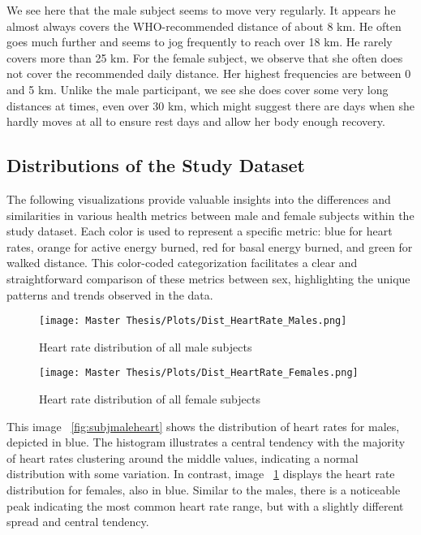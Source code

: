 We see here that the male subject seems to move very regularly. It appears he almost always covers the WHO-recommended distance of about 8 km. He often goes much further and seems to jog frequently to reach over 18 km. He rarely covers more than 25 km. For the female subject, we observe that she often does not cover the recommended daily distance. Her highest frequencies are between 0 and 5 km. Unlike the male participant, we see she does cover some very long distances at times, even over 30 km, which might suggest there are days when she hardly moves at all to ensure rest days and allow her body enough recovery.

\subsection{Distributions of the Study Dataset}

The following visualizations provide valuable insights into the differences and similarities in various health metrics between male and female subjects within the study dataset. Each color is used to represent a specific metric: blue for heart rates, orange for active energy burned, red for basal energy burned, and green for walked distance. This color-coded categorization facilitates a clear and straightforward comparison of these metrics between sex, highlighting the unique patterns and trends observed in the data.

\FloatBarrier
\begin{figure}[h!]
  \centering
  \begin{minipage}[b]{0.7\linewidth}
    \texttt{[image: Master Thesis/Plots/Dist\_HeartRate\_Males.png]}
    \caption{Heart rate distribution of all male subjects}
    \label{fig:subjmaleheart}
  \end{minipage}%
  \quad
  \begin{minipage}[b]{0.7\linewidth}
    \texttt{[image: Master Thesis/Plots/Dist\_HeartRate\_Females.png]}
    \caption{Heart rate distribution of all female subjects}
    \label{fig:subjfemaleheart}
  \end{minipage}
\end{figure}
\FloatBarrier

This image ~\ref{fig:subjmaleheart} shows the distribution of heart rates for males, depicted in blue. The histogram illustrates a central tendency with the majority of heart rates clustering around the middle values, indicating a normal distribution with some variation. In contrast, image ~\ref{fig:subjfemaleheart} displays the heart rate distribution for females, also in blue. Similar to the males, there is a noticeable peak indicating the most common heart rate range, but with a slightly different spread and central tendency.

